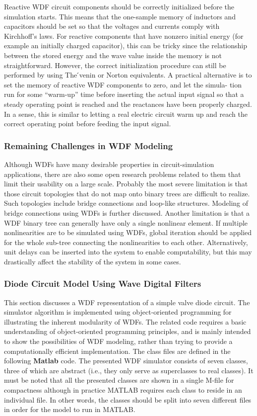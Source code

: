 \documentclass[10pt,a4paper,oneside]{article}
\begin{document}
Reactive WDF circuit components should be correctly initialized before the simulation starts. This means that the one-sample memory of inductors and capacitors should be set so that the voltages and currents comply with Kirchhoff’s laws. For reactive components that have nonzero initial energy (for example an initially charged capacitor), this can be tricky since the relationship between the stored energy and the wave value inside the memory is not straightforward. However, the correct initialization procedure can still be performed by using The ́venin or Norton equivalents. A practical alternative is to set the memory of reactive WDF components to zero, and let the simula- tion run for some “warm-up” time before inserting the actual input signal so that a steady operating point is reached and the reactances have been properly charged. In a sense, this is similar to letting a real electric circuit warm up and reach the correct operating point before feeding the input signal.
\subsubsection{Remaining Challenges in WDF Modeling}
Although WDFs have many desirable properties in circuit-simulation applications, there are also some open research problems related to them that limit their usability on a large scale. Probably the most severe limitation is that those circuit topologies that do not map onto binary trees are difficult to realize. Such topologies include bridge connections and loop-like structures. Modeling of bridge connections using WDFs is further discussed. Another limitation is that a WDF binary tree can generally have only a single nonlinear element. If multiple nonlinearities are to be simulated using WDFs, global iteration should be applied for the whole sub-tree connecting the nonlinearities to each other. Alternatively, unit delays can be inserted into the system to enable computability, but this may drastically affect the stability of the system in some cases.
\subsubsection{Diode Circuit Model Using Wave Digital Filters}
This section discusses a WDF representation of a simple valve diode circuit. The simulator algorithm is implemented using object-oriented programming for illustrating the inherent modularity of WDFs. The related code requires a basic understanding of object-oriented programming principles, and is mainly intended to show the possibilities of WDF modeling, rather than trying to provide a computationally efficient implementation. The class files are defined in the following {\bfseries Matlab} code. The presented WDF simulator consists of seven classes, three of which are abstract (i.e., they only serve as superclasses to real classes). It must be noted that all the presented classes are shown in a single M-file for compactness although in practice MATLAB requires each class to reside in an individual file. In other words, the classes should be split into seven different files in order for the model to run in MATLAB.
\end{document}
